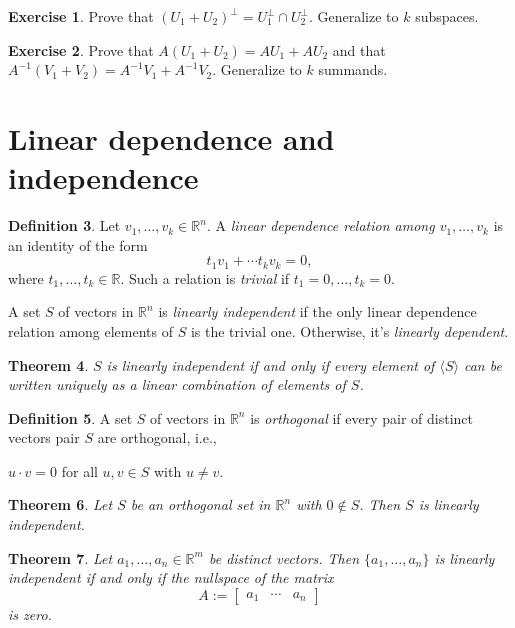 \documentclass[fullpage]{amsart}
\newcommand{\RR}{\mathbb{R}}
\newtheorem{theorem}{Theorem}[section]
\theoremstyle{definition}
\newtheorem{definition}[theorem]{Definition}
\newtheorem{exercise}[theorem]{Exercise}
\begin{document}
\begin{exercise}
  Prove that $(U_1+U_2)^\perp = U_1^\perp\cap U_2^\perp$. Generalize to $k$ subspaces.
\end{exercise}


\begin{exercise}
  Prove that $A(U_1+U_2)=AU_1 + AU_2$ and that $A^{-1}(V_1+V_2)=A^{-1}V_1 + A^{-1}V_2$.
Generalize to $k$ summands.
\end{exercise}

\section{Linear dependence and independence}

  \begin{definition}
    Let $v_1,\ldots,v_k\in\RR^n$.
  A \emph{linear dependence relation among $v_1,\ldots,v_k$} is an identity of the form
  $$
  t_1v_1+\cdots t_kv_k=0,
  $$
  where $t_1,\ldots,t_k\in\RR$. Such a relation is \emph{trivial} if $t_1=0,\ldots, t_k=0$.

   A set $S$ of vectors in $\RR^n$ is \emph{linearly independent} if the only linear dependence relation among elements of $S$ is the trivial one.
  Otherwise, it's \emph{linearly dependent}.
  \end{definition}

  \begin{theorem}
    $S$ is linearly independent if and only if every element of $\langle S\rangle$ can be written uniquely as a linear combination of elements of $S$.
  \end{theorem}

  \begin{definition}
    A set $S$ of vectors in $\RR^n$ is \emph{orthogonal} if every pair of distinct vectors pair $S$ are orthogonal, i.e.,
  \begin{center}
    $u\cdot v = 0$ for all $u, v\in S$ with $u\neq v$.
  \end{center}
\end{definition}

  \begin{theorem}
    Let $S$ be an orthogonal set in $\RR^n$ with $0\notin S$.
    Then $S$ is linearly independent.
  \end{theorem}

  \begin{theorem} Let $a_1,\ldots,a_n\in\RR^m$ be distinct vectors.
  Then $\{a_1,\ldots,a_n\}$ is linearly independent if and only if the nullspace of the matrix
  $$
A := \begin{bmatrix}a_1&\cdots &a_n\end{bmatrix}
  $$
  is zero.
\end{theorem}
\end{document}
